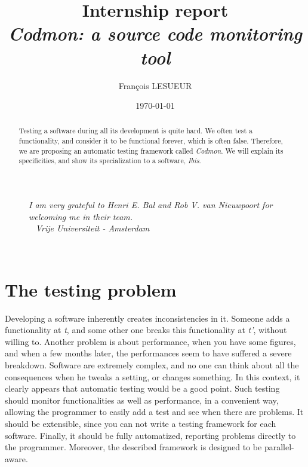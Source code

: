 \documentclass[a4paper,10pt]{article}
\renewcommand{\|}{\url|}
\begin{document}
\title{Internship report\\\emph{Codmon: a source code monitoring tool}}

\author{Fran\c cois LESUEUR}

\date{\today}

\maketitle


\begin{abstract}

Testing a software during all its development is quite hard. We often test a functionality, and consider it to be functional forever, which is often false. Therefore, we are proposing an automatic testing framework called \emph{Codmon}. We will explain its specificities, and show its specialization to a software, \emph{Ibis}.

\end{abstract}



\begin{figure}[b]
  \centering
  \emph{I am very grateful to Henri E. Bal and Rob V. van Nieuwpoort for welcoming me in their team.}\\~\newline
  \emph{Vrije Universiteit - Amsterdam}
\end{figure}
                                                                                
\clearpage
~\clearpage

\section{The testing problem}


Developing a software inherently creates inconsistencies in it. Someone adds a functionality at \emph{t}, and some other one breaks this functionality at \emph{t'}, without willing to. Another problem is about performance, when you have some figures, and when a few months later, the performances seem to have suffered a severe breakdown. Software are extremely complex, and no one can think about all the consequences when he tweaks a setting, or changes something. In this context, it clearly appears that automatic testing would be a good point. Such testing should monitor functionalities as well as performance, in a convenient way, allowing the programmer to easily add a test and see when there are problems. It should be extensible, since you can not write a testing framework for each software. Finally, it should be fully automatized, reporting problems directly to the programmer. Moreover, the described framework is designed to be parallel-aware.
\end{document}
